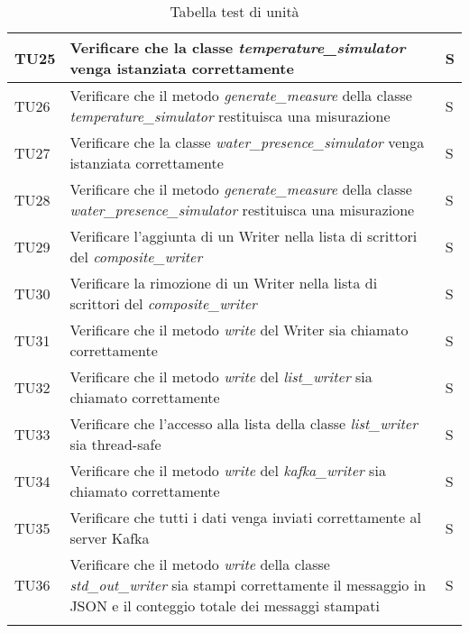 \begin{longtable}{|C{1.9cm}|L{5.5cm}|C{2cm}|}
    TU25 & Verificare che la classe \textit{temperature\_simulator} venga istanziata correttamente & S \\
    \hline

    TU26 & Verificare che il metodo \textit{generate\_measure} della classe \textit{temperature\_simulator} restituisca una misurazione & S \\
    \hline

    TU27 & Verificare che la classe \textit{water\_presence\_simulator} venga istanziata correttamente & S \\
    \hline

    TU28 & Verificare che il metodo \textit{generate\_measure} della classe \textit{water\_presence\_simulator} restituisca una misurazione & S \\
    \hline

    TU29 & Verificare l'aggiunta di un Writer nella lista di scrittori del \textit{composite\_writer} & S \\   
    \hline

    TU30 & Verificare la rimozione di un Writer nella lista di scrittori del \textit{composite\_writer} & S \\
    \hline

    TU31 & Verificare che il metodo \textit{write} del Writer sia chiamato correttamente & S \\
    \hline

    TU32 & Verificare che il metodo \textit{write} del \textit{list\_writer} sia chiamato correttamente & S \\
    \hline

    TU33 & Verificare che l'accesso alla lista della classe \textit{list\_writer} sia thread-safe & S \\
    \hline

    TU34 & Verificare che il metodo \textit{write} del \textit{kafka\_writer} sia chiamato correttamente & S \\
    \hline

    TU35 & Verificare che tutti i dati venga inviati correttamente al server Kafka & S \\
    \hline

    TU36 & Verificare che il metodo \textit{write} della classe \textit{std\_out\_writer} sia stampi correttamente il messaggio in JSON e il conteggio totale dei messaggi stampati & S \\ 
    \hline


    \caption{Tabella test di unità}
\end{longtable}
